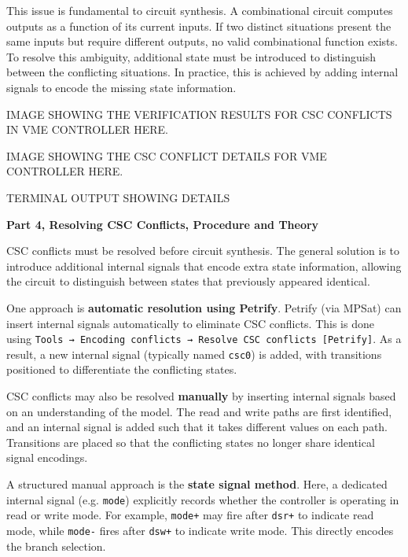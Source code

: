 \documentclass[a4paper,12pt]{article}
\begin{document}
This issue is fundamental to circuit synthesis. A combinational circuit computes outputs as a function of its current inputs. If two distinct situations present the same inputs but require different outputs, no valid combinational function exists. To resolve this ambiguity, additional state must be introduced to distinguish between the conflicting situations. In practice, this is achieved by adding internal signals to encode the missing state information.

\begin{large}
    IMAGE SHOWING THE VERIFICATION RESULTS FOR CSC CONFLICTS IN VME CONTROLLER HERE.
\end{large}

\begin{large}
    IMAGE SHOWING THE CSC CONFLICT DETAILS FOR VME CONTROLLER HERE.
\end{large}

\begin{large}
    TERMINAL OUTPUT SHOWING DETAILS
\end{large}

\textbf{Part 4, Resolving CSC Conflicts, Procedure and Theory}

CSC conflicts must be resolved before circuit synthesis. The general solution is to introduce additional internal signals that encode extra state information, allowing the circuit to distinguish between states that previously appeared identical.

One approach is \textbf{automatic resolution using Petrify}. Petrify (via MPSat) can insert internal signals automatically to eliminate CSC conflicts. This is done using \texttt{Tools → Encoding conflicts → Resolve CSC conflicts [Petrify]}. As a result, a new internal signal (typically named \texttt{csc0}) is added, with transitions positioned to differentiate the conflicting states.

CSC conflicts may also be resolved \textbf{manually} by inserting internal signals based on an understanding of the model. The read and write paths are first identified, and an internal signal is added such that it takes different values on each path. Transitions are placed so that the conflicting states no longer share identical signal encodings.

A structured manual approach is the \textbf{state signal method}. Here, a dedicated internal signal (e.g. \texttt{mode}) explicitly records whether the controller is operating in read or write mode. For example, \texttt{mode+} may fire after \texttt{dsr+} to indicate read mode, while \texttt{mode-} fires after \texttt{dsw+} to indicate write mode. This directly encodes the branch selection.
\end{document}
